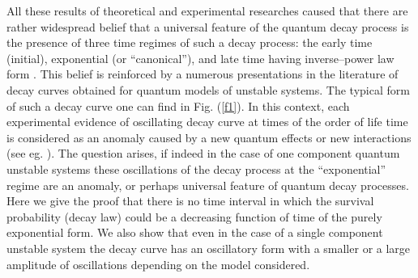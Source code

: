 \documentclass[12pt]{article}
\begin{document}
All these results of theoretical and experimental researches caused that
there are rather widespread belief that a universal feature of the quantum decay process is the presence of three
time regimes of such a decay process:
the early time (initial), exponential (or ``canonical''), and late time having inverse--power law form \cite{peshkin}.
This  belief is reinforced by a numerous presentations in the literature of decay curves obtained for quantum models of unstable systems. The typical form of such a decay curve one can find in Fig. (\ref{f1}).
In this context, each experimental  evidence of oscillating decay curve at times of the order of life time is considered as an anomaly caused by a new quantum effects or new interactions (see eg. \cite{litwinov1,kienle}).
The question arises, if indeed in the case of one component quantum unstable systems these oscillations of the decay process at the ``exponential'' regime are an anomaly, or perhaps universal feature of quantum decay processes.
Here
we give the proof that there is no time interval in which the survival probability (decay law) could be a decreasing function of time of the purely exponential form.
We also show that even in the case of a single component unstable system the decay  curve has an oscillatory form with a smaller or a large amplitude of oscillations depending on the model considered.
\end{document}
